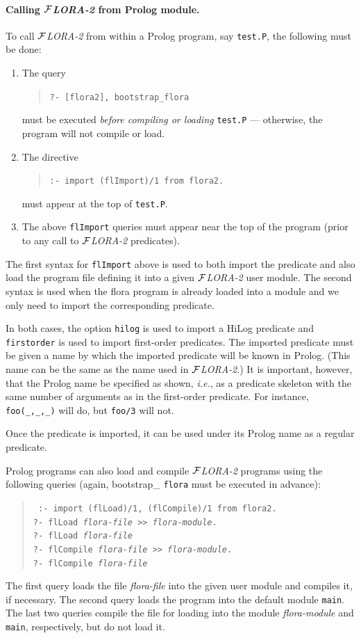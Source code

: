 \documentclass[11pt]{article}
\newcommand{\FLORA}{{\mbox{${\cal F}${\small\it LORA}\rm\emph{-2}}}\xspace}
\begin{document}
\paragraph{Calling \FLORA from Prolog module.}
To call \FLORA from within a Prolog program, say {\tt test.P}, the
  following must be done:
  \begin{enumerate}
  \item  The query 
    \begin{quote}
      {\tt ?- [flora2], bootstrap\_flora} 
    \end{quote}
    must be executed \emph{before compiling or loading} {\tt test.P} ---
    otherwise, the program will not compile or load.
  \item The directive
    \begin{quote}
      {\tt :- import (flImport)/1 from flora2.}    
    \end{quote}
    must appear at the top of {\tt test.P}.
  \item The above {\tt flImport} queries must appear near the top of the
    program (prior to any call to \FLORA predicates).
  \end{enumerate}
  
  The first syntax for {\tt flImport} above is used to both import the
  predicate and also load the program file defining it into a given \FLORA
  user module. The second syntax is used when the flora program is already
  loaded into a module and we only need to import the corresponding
  predicate.

In both cases, the option {\tt hilog} is used to import a HiLog predicate
and {\tt firstorder} is used to import first-order predicates. The imported
predicate must be given a name by which the imported predicate will be
known in Prolog.  (This name can be the same as the name used in \FLORA.)
It is important, however, that the Prolog name be specified as shown, {\it
  i.e.}, as a predicate skeleton with the same number of arguments as in
the first-order predicate. For instance, {\tt foo(\_,\_,\_)} will do, but
{\tt foo/3} will not.

Once the predicate is imported, it can be used under its Prolog name as a
regular predicate.

Prolog programs can also load and compile \FLORA programs using the following
queries (again, bootstrap\_ {\tt flora} must be executed in advance): 
\begin{quote}
 \tt
 :- import (flLoad)/1, (flCompile)/1 from flora2.\\
 ?- flLoad  {\it flora-file} >> {\it flora-module}.\\
 ?- flLoad  {\it flora-file}\\
 ?- flCompile {\it flora-file} >> {\it flora-module}.\\
 ?- flCompile  {\it flora-file}
\end{quote}
The first query loads the file {\it flora-file\/} into the given user
module and compiles it, if necessary. The second query loads the program
into the default module {\tt main}. The last two queries compile the file
for loading into the module {\it flora-module} and {\tt main},
respectively, but do not load it.
\end{document}
